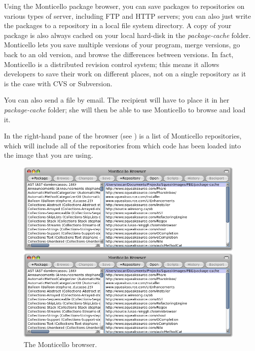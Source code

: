 \documentclass[a4paper,10pt,twoside]{book}
\begin{document}
Using the Monticello package browser, you can save packages to repositories on various types of server, including FTP and HTTP servers; you can also just write the packages to a repository in a local file system directory.
A copy of your package is also always cached on your local hard-disk in the \emph{package-cache} folder. 
Monticello lets you save multiple versions of your program, merge versions, go back to an old version, and browse the differences between versions. 
In fact, Monticello is a distributed revision control system; this means it allows developers to save their work on different places, not on a single repository as it is the case with CVS or Subversion.

You can also send a  file by email. 
The recipient will have to place it in her \emph{package-cache} folder; she will then be able to use Monticello to browse and load it. 

In the right-hand pane of the browser (see ) is a list of Monticello repositories, which will include all of the repositories from which code has been loaded into the image that you are using.  

\begin{figure}[hbt]
\ifluluelse
	{\centerline {\includegraphics[width=\textwidth]{MonticelloBrowser}}}
	{\centerline {\includegraphics[scale=0.7]{MonticelloBrowser}}}
\caption{The Monticello browser.
}
\end{figure}
\end{document}
